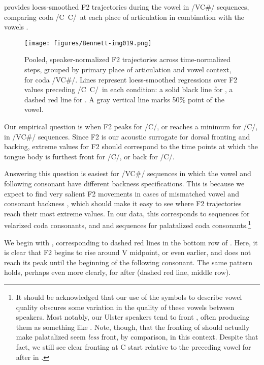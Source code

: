 \documentclass[output=paper,colorlinks,citecolor=brown]{langscibook}
\newcommand{\pal}{\ipa{ʲ}}
\newcommand{\vel}{\ipa{ˠ}}
\newcommand{\palvelcon}{/C\vel\ C\pal/}
\begin{document}
 provides loess-smoothed F2 trajectories during the vowel in /VC\#/ sequences, comparing coda \palvelcon\ at each place of articulation in combination with the vowels .

\begin{figure}
    \centering
    \texttt{[image: figures/Bennett-img019.png]}
    \caption{Pooled, speaker-normalized F2 trajectories across time-normalized steps, grouped by primary place of articulation and vowel context, for coda /VC\#/. Lines represent loess-smoothed regressions over F2 values preceding \palvelcon\ in each condition: a solid black line for \ipa{/C\vel/}, a dashed red line for \ipa{/C\pal/}. A gray vertical line marks 50\% point of the vowel.}
    \label{fig:lognormf2}
\end{figure}

\newpage
Our empirical question is when F2 peaks for /C\pal/, or reaches a minimum for /C\vel/, in /VC\#/ sequences. Since F2 is our acoustic surrogate for dorsal fronting and backing, extreme values for F2 should correspond to the time points at which the tongue body is furthest front for /C\pal/, or back for /C\vel/.

Answering this question is easiest for /VC\#/ sequences in which the vowel and following consonant have different backness specifications. This is because we expect to find very salient F2 movements in cases of mismatched vowel and consonant backness \citep{Bennett_etal2018_Conamara_ultrasound}, which should make it easy to see where F2 trajectories reach their most extreme values. In our data, this corresponds to \ipa{/iːC\vel/} sequences for velarized coda consonants, and \ipa{/uːC\pal/} and \ipa{/ɔːC\pal/} sequences for palatalized coda consonants.\footnote{It should be acknowledged that our use of the symbols  to describe vowel quality obscures some variation in the quality of these vowels between speakers. Most notably, our Ulster speakers tend to front , often producing them as something like \ipa{[ʌː ɛː]}.
Note, though, that the fronting of  should actually make palatalized  seem \emph{less} front, by comparison, in this context. Despite that fact, we still see clear fronting at C start relative to the preceding vowel for  after  in .}

We begin with \ipa{/uːC\pal/}, corresponding to dashed red lines in the bottom row of . Here, it is clear that F2 begins to rise around V midpoint, or even earlier, and does not reach its peak until the beginning of the following consonant. The same pattern holds, perhaps even more clearly, for  after  (dashed red line, middle row).
\end{document}
